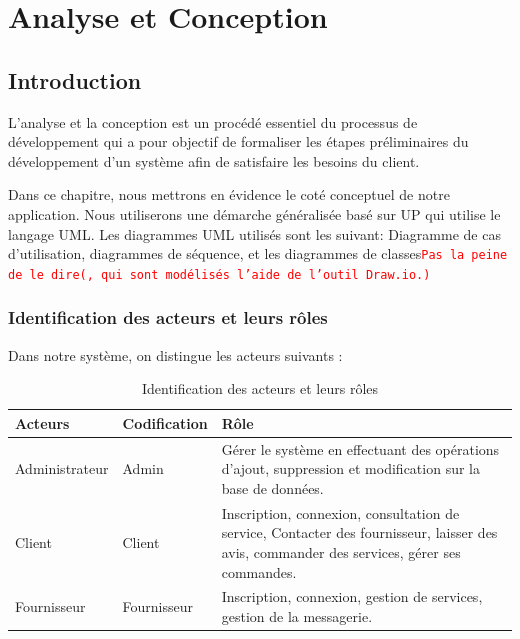 \documentclass[french]{report}
\newcommand\rmq[1]{\textcolor{red}{\tt #1}}
\begin{document}



\chapter{Analyse et Conception}

\section{Introduction}

L'analyse et la conception est un procédé essentiel du processus de
développement qui a pour objectif de formaliser les étapes préliminaires du
développement d'un système afin de satisfaire les besoins du client.

Dans ce chapitre, nous mettrons en évidence le coté conceptuel de notre
application. Nous utiliserons une démarche généralisée basé sur UP qui utilise
le langage UML. Les diagrammes UML utilisés sont les suivant: Diagramme de cas
d'utilisation, diagrammes de séquence, et les diagrammes de classes\rmq{Pas la
peine de le dire(, qui sont modélisés l'aide de l'outil Draw.io.)}

\subsection{Identification des acteurs et leurs rôles }

Dans notre système, on distingue les acteurs suivants :

\begin{table}[h!]
    \centering
    \begin{tabular}{ |m{4cm}|m{4cm}|m{4cm}| }
    \hline
    \textbf{Acteurs} & \textbf{Codification} & \textbf{Rôle} \\
    \hline
    Administrateur & Admin & Gérer le système en effectuant des opérations
        d'ajout, suppression et modification sur la base de données.\\
    \hline
    Client & Client & Inscription, connexion,  consultation de service,
        Contacter des fournisseur, laisser des avis, commander des services,
        gérer ses commandes.\\
    \hline
    Fournisseur & Fournisseur & Inscription, connexion, gestion de services,
        gestion de la messagerie.\\
    \hline
    \end{tabular}
    \caption{Identification des acteurs et leurs rôles}
    \label{Tableaux:1}
\end{table}
\end{document}
